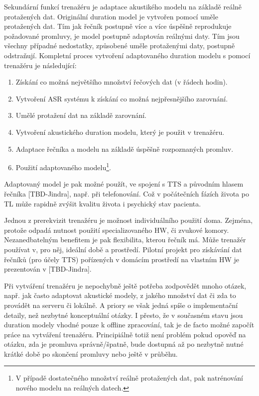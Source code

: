 Sekundární funkcí trenažéru je adaptace akustikého modelu na základě reálně protažených dat. Originální duration model je vytvořen pomocí uměle protažených dat. Tím jak řečník postupně více a více úspěšně reprodukuje požadované promluvy, je model postupně adaptován reálnými daty. Tím jsou všechny případné nedostatky, způsobené uměle protaženými daty, postupně odstraňují. Kompletní proces vytvoření adaptovaného duration modelu s pomocí trenažéru je následující:

\begin{enumerate}
  \item Získání co možná největšího množství řečových dat (v řádech hodin).
  \item Vytvoření ASR systému k získání co možná nejpřesnějšího zarovnání.
  \item Umělé protažení dat na základě zarovnání.
  \item Vytvoření akustického duration modelu, který je použit v trenažéru.
  \item Adaptace řečníka a modelu na základě úspěšně rozpoznaných promluv.
  \item Použití adaptovaného modelu\footnote{V případě dostatečného množství reálně protažených dat, pak natrénování nového modelu na reálných datech.}.
\end{enumerate}

\noindent Adaptovaný model je pak možné použít, ve spojení s TTS a původním hlasem řečníka [TBD-Jindra], např. při telefonování. Což v počátečních fázích života po TL může rapidně zvýšit kvalitu života i psychický stav pacienta.

Jednou z prerekvizit trenažéru je možnost individuálního použití doma. Zejména, protože odpadá nutnost použití specializovaného HW, či zvukové komory. Nezanedbatelným benefitem je pak flexibilita, kterou řečník má. Může trenažér používat v, pro něj, ideální době a prostředí. Pilotní projekt pro získávání dat řečníků (pro účely TTS) pořízených v domácím prostředí na vlastním HW je prezentován v [TBD-Jindra].

Při vytváření trenažéru je nepochybně ještě potřeba zodpovědět mnoho otázek,  např. jak často adaptovat akustické modely, z jakého množství dat či zda to provádět na serveru či lokálně. A priory se však jedná spíše o implementační detaily, než nezbytné konceptuální otázky. I přesto, že v současném stavu jsou duration modely vhodné pouze k offline zpracování, tak je de facto možné započít práce na vytváření trenažéru. Principiálně totiž není problém pokud opověď na otázku, zda je promluva správně/špatně, bude dostupná až po nezbytně nutné krátké době po skončení promluvy nebo ještě v průběhu.

